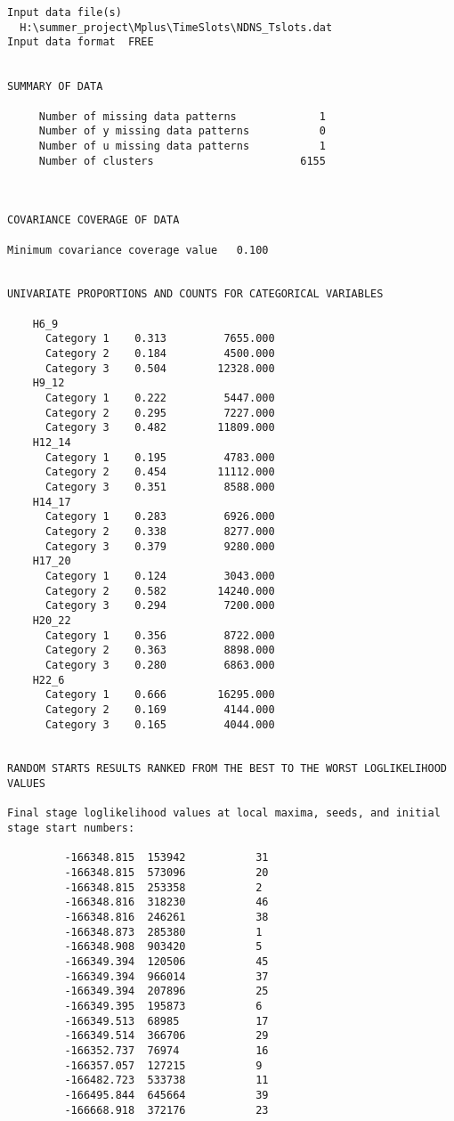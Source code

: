 \documentclass[]{article}
\begin{document}
\begin{verbatim}
Input data file(s)
  H:\summer_project\Mplus\TimeSlots\NDNS_Tslots.dat
Input data format  FREE


SUMMARY OF DATA

     Number of missing data patterns             1
     Number of y missing data patterns           0
     Number of u missing data patterns           1
     Number of clusters                       6155



COVARIANCE COVERAGE OF DATA

Minimum covariance coverage value   0.100


UNIVARIATE PROPORTIONS AND COUNTS FOR CATEGORICAL VARIABLES

    H6_9
      Category 1    0.313         7655.000
      Category 2    0.184         4500.000
      Category 3    0.504        12328.000
    H9_12
      Category 1    0.222         5447.000
      Category 2    0.295         7227.000
      Category 3    0.482        11809.000
    H12_14
      Category 1    0.195         4783.000
      Category 2    0.454        11112.000
      Category 3    0.351         8588.000
    H14_17
      Category 1    0.283         6926.000
      Category 2    0.338         8277.000
      Category 3    0.379         9280.000
    H17_20
      Category 1    0.124         3043.000
      Category 2    0.582        14240.000
      Category 3    0.294         7200.000
    H20_22
      Category 1    0.356         8722.000
      Category 2    0.363         8898.000
      Category 3    0.280         6863.000
    H22_6
      Category 1    0.666        16295.000
      Category 2    0.169         4144.000
      Category 3    0.165         4044.000


RANDOM STARTS RESULTS RANKED FROM THE BEST TO THE WORST LOGLIKELIHOOD VALUES

Final stage loglikelihood values at local maxima, seeds, and initial stage start numbers:

         -166348.815  153942           31
         -166348.815  573096           20
         -166348.815  253358           2
         -166348.816  318230           46
         -166348.816  246261           38
         -166348.873  285380           1
         -166348.908  903420           5
         -166349.394  120506           45
         -166349.394  966014           37
         -166349.394  207896           25
         -166349.395  195873           6
         -166349.513  68985            17
         -166349.514  366706           29
         -166352.737  76974            16
         -166357.057  127215           9
         -166482.723  533738           11
         -166495.844  645664           39
         -166668.918  372176           23



\end{verbatim}
\end{document}
